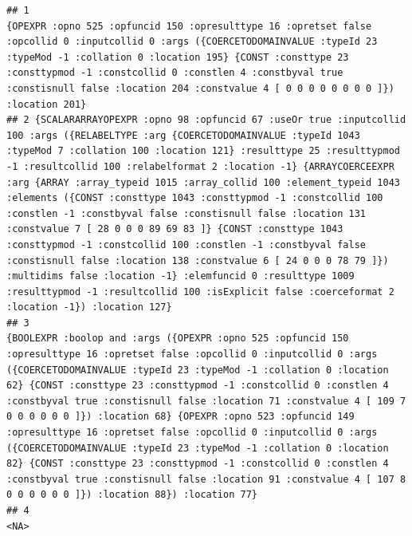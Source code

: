 \documentclass[]{book}
\theoremstyle{definition}
\theoremstyle{definition}
\theoremstyle{definition}
\theoremstyle{remark}
\begin{document}
\begin{verbatim}
## 1                                                                                                                                                                                                                                                                                                                                                                                                                                                                                                       {OPEXPR :opno 525 :opfuncid 150 :opresulttype 16 :opretset false :opcollid 0 :inputcollid 0 :args ({COERCETODOMAINVALUE :typeId 23 :typeMod -1 :collation 0 :location 195} {CONST :consttype 23 :consttypmod -1 :constcollid 0 :constlen 4 :constbyval true :constisnull false :location 204 :constvalue 4 [ 0 0 0 0 0 0 0 0 ]}) :location 201}
## 2 {SCALARARRAYOPEXPR :opno 98 :opfuncid 67 :useOr true :inputcollid 100 :args ({RELABELTYPE :arg {COERCETODOMAINVALUE :typeId 1043 :typeMod 7 :collation 100 :location 121} :resulttype 25 :resulttypmod -1 :resultcollid 100 :relabelformat 2 :location -1} {ARRAYCOERCEEXPR :arg {ARRAY :array_typeid 1015 :array_collid 100 :element_typeid 1043 :elements ({CONST :consttype 1043 :consttypmod -1 :constcollid 100 :constlen -1 :constbyval false :constisnull false :location 131 :constvalue 7 [ 28 0 0 0 89 69 83 ]} {CONST :consttype 1043 :consttypmod -1 :constcollid 100 :constlen -1 :constbyval false :constisnull false :location 138 :constvalue 6 [ 24 0 0 0 78 79 ]}) :multidims false :location -1} :elemfuncid 0 :resulttype 1009 :resulttypmod -1 :resultcollid 100 :isExplicit false :coerceformat 2 :location -1}) :location 127}
## 3                                                                                                             {BOOLEXPR :boolop and :args ({OPEXPR :opno 525 :opfuncid 150 :opresulttype 16 :opretset false :opcollid 0 :inputcollid 0 :args ({COERCETODOMAINVALUE :typeId 23 :typeMod -1 :collation 0 :location 62} {CONST :consttype 23 :consttypmod -1 :constcollid 0 :constlen 4 :constbyval true :constisnull false :location 71 :constvalue 4 [ 109 7 0 0 0 0 0 0 ]}) :location 68} {OPEXPR :opno 523 :opfuncid 149 :opresulttype 16 :opretset false :opcollid 0 :inputcollid 0 :args ({COERCETODOMAINVALUE :typeId 23 :typeMod -1 :collation 0 :location 82} {CONST :consttype 23 :consttypmod -1 :constcollid 0 :constlen 4 :constbyval true :constisnull false :location 91 :constvalue 4 [ 107 8 0 0 0 0 0 0 ]}) :location 88}) :location 77}
## 4                                                                                                                                                                                                                                                                                                                                                                                                                                                                                                                                                                                                                                                                                                                                                                                                                                                  <NA>

\end{verbatim}
\end{document}

